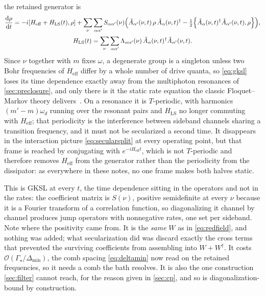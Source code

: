 \documentclass[a4paper,11pt]{article}
\newcommand{\eff}{\mathrm{eff}}
\begin{document}
the retained generator is
\begin{equation}\label{eq:gksl}
  \begin{gathered}
  \dv{\rho}{t} = -i\comm{H_\eff + H_{\mathrm{LS}}(t)}{\rho}
  + \sum_{\nu}\sum_{\alpha\alpha'} S_{\alpha\alpha'}(\nu)
  \Big( \hat A_{\alpha'}(\nu,t)\,\rho\,\hat A_{\alpha}(\nu,t)^\dagger
  - \tfrac12\acomm{\hat A_{\alpha}(\nu,t)^\dagger \hat A_{\alpha'}(\nu,t)}{\rho} \Big),\\[2pt]
  H_{\mathrm{LS}}(t) = \sum_\nu\sum_{\alpha\alpha'}\Lambda_{\alpha\alpha'}(\nu)\,\hat A_\alpha(\nu,t)^\dagger\hat A_{\alpha'}(\nu,t).
  \end{gathered}
\end{equation}
Since $\nu$ together with $m$ fixes $\omega$, a degenerate group is a singleton unless two Bohr frequencies of $H_\eff$ differ by a whole number of drive quanta, so \eqref{eq:gksl} loses its time dependence exactly away from the multiphoton resonances of \cref{sec:preclosure}, and only there is it the static rate equation the classic Floquet--Markov theory delivers~\cite{Grifoni1998Driven,hone2009Statisticala}. On a resonance it is $T$-periodic, with harmonics $(m'-m)\omega_d$ running over the resonant pairs and $H_{\mathrm{LS}}$ no longer commuting with $H_\eff$; that periodicity is the interference between sideband channels sharing a transition frequency, and it must not be secularized a second time. It disappears in the interaction picture \eqref{eq:secularsplit} at every operating point, but that frame is reached by conjugating with $e^{-iH_\eff t}$, which is not $T$-periodic and therefore removes $H_\eff$ from the generator rather than the periodicity from the dissipator: as everywhere in these notes, no one frame makes both halves static.

This is GKSL at every $t$, the time dependence sitting in the operators and not in the rates: the coefficient matrix is $S(\nu)$, positive semidefinite at every $\nu$ because it is a Fourier transform of a correlation function, so diagonalizing it channel by channel produces jump operators with nonnegative rates, one set per sideband. Note where the positivity came from. It is the \emph{same} $W$ as in \eqref{eq:redfield}, and nothing was added; what secularization did was discard exactly the cross terms that prevented the surviving coefficients from assembling into $W+W^\dagger$. It costs $\mathcal O(\Gamma_{\!\star}/\Delta_{\min})$, the comb spacing \eqref{eq:deltamin} now read on the retained frequencies, so it needs a comb the bath resolves. It is also the one construction \cref{sec:filter} cannot reach, for the reason given in \cref{sec:cp}, and so is diagonalization-bound by construction.
\end{document}
